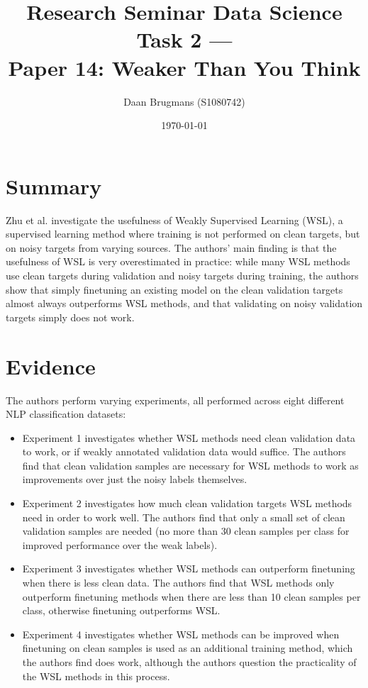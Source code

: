 \documentclass{IEEEtran}
\begin{document}
\title{Research Seminar Data Science Task 2 ---\\Paper 14: Weaker Than You Think}
\author{Daan Brugmans (S1080742)}
\date{\today}

\maketitle

\section{Summary}
Zhu et al. investigate the usefulness of Weakly Supervised Learning (WSL), a supervised learning method where training is not performed on clean targets, but on noisy targets from varying sources.
The authors' main finding is that the usefulness of WSL is very overestimated in practice: while many WSL methods use clean targets during validation and noisy targets during training, the authors show that simply finetuning an existing model on the clean validation targets almost always outperforms WSL methods, and that validating on noisy validation targets simply does not work.

\section{Evidence}
The authors perform varying experiments, all performed across eight different NLP classification datasets:
\begin{itemize}
    \item Experiment 1 investigates whether WSL methods need clean validation data to work, or if weakly annotated validation data would suffice. The authors find that clean validation samples are necessary for WSL methods to work as improvements over just the noisy labels themselves.
    \item Experiment 2 investigates how much clean validation targets WSL methods need in order to work well. The authors find that only a small set of clean validation samples are needed (no more than 30 clean samples per class for improved performance over the weak labels).
    \item Experiment 3 investigates whether WSL methods can outperform finetuning when there is less clean data. The authors find that WSL methods only outperform finetuning methods when there are less than 10 clean samples per class, otherwise finetuning outperforms WSL.
    \item Experiment 4 investigates whether WSL methods can be improved when finetuning on clean samples is used as an additional training method, which the authors find does work, although the authors question the practicality of the WSL methods in this process.
\end{itemize}
\end{document}
